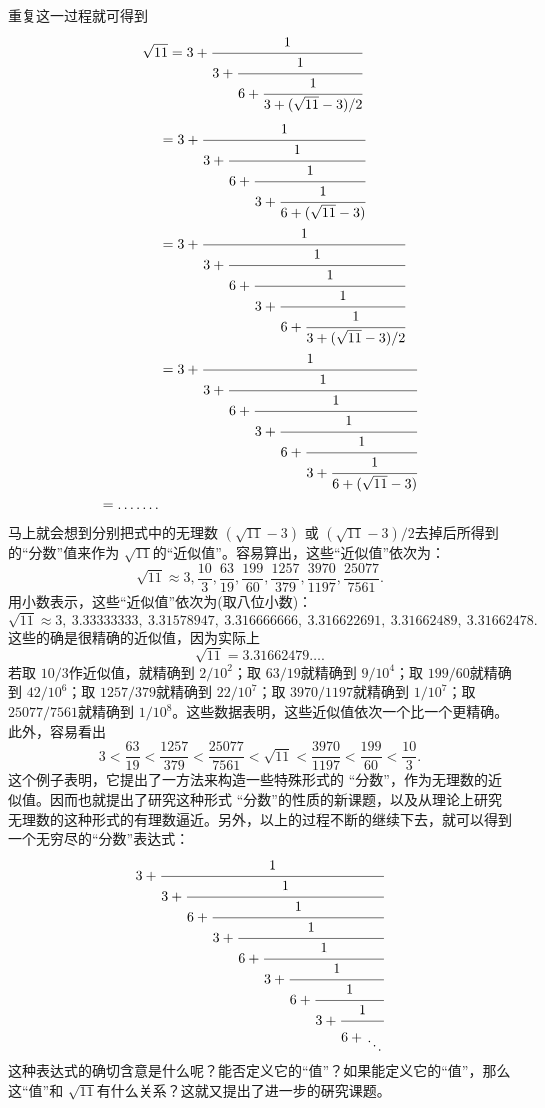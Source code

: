 \begin{example}
	重复这一过程就可得到
	\begin{align}
		\sqrt{11} & =
		3 + \cfrac{1}{3 +
			\cfrac{1}{6 +
				\cfrac{1}{3 +
					(\sqrt{11} -3)/2
				}}}          \label{cf5}
	\end{align}
	\begin{align}
		 & =
		3 + \cfrac{1}{3 +
			\cfrac{1}{6 +
				\cfrac{1}{3 +
					\cfrac{1}{6 +
						(\sqrt{11} -3)
		}}}}          \label{cf6} \\
		 & =
		3 + \cfrac{1}{3 +
			\cfrac{1}{6 +
				\cfrac{1}{3 +
					\cfrac{1}{6 +
						\cfrac{1}{3 +
							(\sqrt{11} -3) / 2
		}}}}}        \label{cf7}  \\
		 & =
		3 + \cfrac{1}{3 +
			\cfrac{1}{6 +
				\cfrac{1}{3 +
					\cfrac{1}{6 +
						\cfrac{1}{3 +
							\cfrac{1}{6 +
								(\sqrt{11} -3)
		}}}}}}        \label{cf8} \\
		= \dots\dots. \nonumber
	\end{align}
	马上就会想到分别把式中的无理数 \( (\sqrt{11} - 3) \) 或 \( (\sqrt{11} - 3)/2
	\)去掉后所得到的\enquote{分数}值来作为 \( \sqrt{11} \)的\enquote{近似值}。容易算出，这些\enquote{近似值}依次为：
	\begin{equation}\label{eq:根号11}
		\sqrt{11} \approx 3, \frac{10}{3}, \frac{63}{19}, \frac{199}{60}, \frac{1257}{379}, \frac{3970}{1197},
		\frac{25077}{7561}.
	\end{equation}
	用小数表示，这些\enquote{近似值}依次为(取八位小数)：
	\begin{equation}
		\sqrt{11} \approx 3,\: 3.33333333,\:3.31578947,\:3.316666666,\: 3.316622691,\: 3.31662489,\: 3.31662478.
	\end{equation}
	这些的确是很精确的近似值，因为实际上
	\begin{equation}
		\sqrt{11} = 3.31662479\dots.
	\end{equation}
	若取 \( 10 / 3 \)作近似值，就精确到 \( 2 / 10^2 \)；取 \( 63 / 19 \)就精确到 \( 9 / 10^4 \)；取 \( 199 / 60 \)就精确到
	\( 42 / 10^6 \)；取 \( 1257 / 379 \)就精确到 \( 22 / 10^7 \)；取 \( 3970 / 1197 \)就精确到 \( 1 / 10^7 \)；取 \( 25077 /
	7561\)就精确到 \( 1/10^8 \)。这些数据表明，这些近似值依次一个比一个更精确。此外，容易看出
	\begin{equation}
		3 < \frac{63}{19} < \frac{1257}{379} < \frac{25077}{7561} < \sqrt{11} < \frac{3970}{1197} < \frac{199}{60} <
		\frac{10}{3}.
	\end{equation}
	这个例子表明，它提出了一方法来构造一些特殊形式的 \enquote{分数}，作为无理数的近似值。因而也就提出了研究这种形式
	\enquote{分数}的性质的新课题，以及从理论上研究无理数的这种形式的有理数逼近。另外，以上的过程不断的继续下去，就可以得到
	一个无穷尽的\enquote{分数}表达式：
	\begin{equation}
		3 + \cfrac{1}{3 +
			\cfrac{1}{6 +
				\cfrac{1}{3 +
					\cfrac{1}{6 +
						\cfrac{1}{3 +
							\cfrac{1}{6 +
								\cfrac{1}{3 +
									\cfrac{1}{6 +
										\genfrac{}{}{0pt}{}{\phantom{1}}{\ddots}
									}}}}}}}}
	\end{equation}
	这种表达式的确切含意是什么呢？能否定义它的\enquote{值}？如果能定义它的\enquote{值}，那么这\enquote{值}和 \( \sqrt{11}
	\)有什么关系？这就又提出了进一步的硏究课题。
\end{example}

